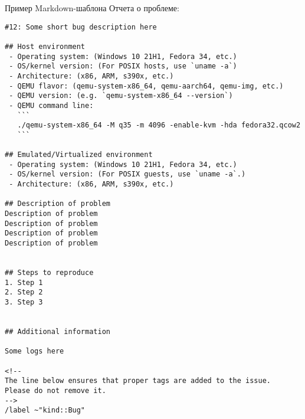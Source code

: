 
\pagebreak
\begin{center}
\end{center}

Пример Markdown-шаблона Отчета о проблеме:

\begin{lstlisting}[label={lst:bugreport}]
#12: Some short bug description here

## Host environment
 - Operating system: (Windows 10 21H1, Fedora 34, etc.)
 - OS/kernel version: (For POSIX hosts, use `uname -a`)
 - Architecture: (x86, ARM, s390x, etc.)
 - QEMU flavor: (qemu-system-x86_64, qemu-aarch64, qemu-img, etc.)
 - QEMU version: (e.g. `qemu-system-x86_64 --version`)
 - QEMU command line:
   ```
   ./qemu-system-x86_64 -M q35 -m 4096 -enable-kvm -hda fedora32.qcow2
   ```

## Emulated/Virtualized environment
 - Operating system: (Windows 10 21H1, Fedora 34, etc.)
 - OS/kernel version: (For POSIX guests, use `uname -a`.)
 - Architecture: (x86, ARM, s390x, etc.)

## Description of problem
Description of problem
Description of problem
Description of problem
Description of problem


## Steps to reproduce
1. Step 1
2. Step 2
3. Step 3


## Additional information

Some logs here

<!--
The line below ensures that proper tags are added to the issue.
Please do not remove it.
-->
/label ~"kind::Bug"

\end{lstlisting}